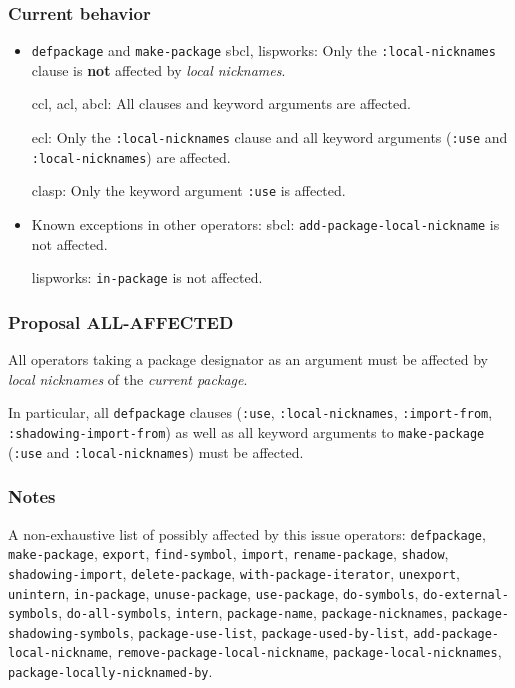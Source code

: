 \documentclass[11pt]{article}
\begin{document}
\subsubsection{Current behavior}
\label{sec:orgc70580a}
\begin{itemize}
\item \texttt{defpackage} and \texttt{make-package}
sbcl, lispworks:
  Only the \texttt{:local-nicknames} clause is \textbf{not} affected by \emph{local nicknames}.

ccl, acl, abcl:
  All clauses and keyword arguments are affected.

ecl:
  Only the \texttt{:local-nicknames} clause and all keyword arguments (\texttt{:use} and
  \texttt{:local-nicknames}) are affected.

clasp:
  Only the keyword argument \texttt{:use} is affected.
\item Known exceptions in other operators:
sbcl: \texttt{add-package-local-nickname} is not affected.

lispworks: \texttt{in-package} is not affected.
\end{itemize}
\subsubsection{Proposal ALL-AFFECTED}
\label{sec:org6970814}
All operators taking a package designator as an argument must be affected by
\emph{local nicknames} of the \emph{current package}.

In particular, all \texttt{defpackage} clauses (\texttt{:use}, \texttt{:local-nicknames},
\texttt{:import-from}, \texttt{:shadowing-import-from}) as well as all keyword arguments to
\texttt{make-package} (\texttt{:use} and \texttt{:local-nicknames}) must be affected.
\subsubsection{Notes}
\label{sec:org8718d26}
A non-exhaustive list of possibly affected by this issue operators:
  \texttt{defpackage}, \texttt{make-package}, \texttt{export}, \texttt{find-symbol}, \texttt{import},
  \texttt{rename-package}, \texttt{shadow}, \texttt{shadowing-import}, \texttt{delete-package},
  \texttt{with-package-iterator}, \texttt{unexport}, \texttt{unintern}, \texttt{in-package}, \texttt{unuse-package},
  \texttt{use-package}, \texttt{do-symbols}, \texttt{do-external-symbols}, \texttt{do-all-symbols}, \texttt{intern},
  \texttt{package-name}, \texttt{package-nicknames}, \texttt{package-shadowing-symbols},
  \texttt{package-use-list}, \texttt{package-used-by-list}, \texttt{add-package-local-nickname},
  \texttt{remove-package-local-nickname}, \texttt{package-local-nicknames},
  \texttt{package-locally-nicknamed-by}.
\end{document}
